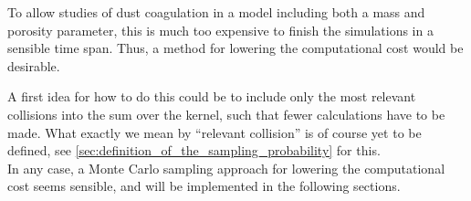     To allow studies of dust coagulation in a model including both a mass and porosity parameter,
    this is much too expensive to finish the simulations in a sensible time span. Thus, a method 
    for lowering the computational cost would be desirable. 
    
    \clearpage
    A first idea for how to do this could be to include only the most relevant collisions into the 
    sum over the kernel, such that fewer calculations have to be made. 
    What exactly we mean by ``relevant collision'' is of course yet to be defined, see
    \cref{sec:definition_of_the_sampling_probability} for this. \\

    In any case, a Monte Carlo sampling approach for lowering the computational cost seems 
    sensible, and will be implemented in the following sections.



